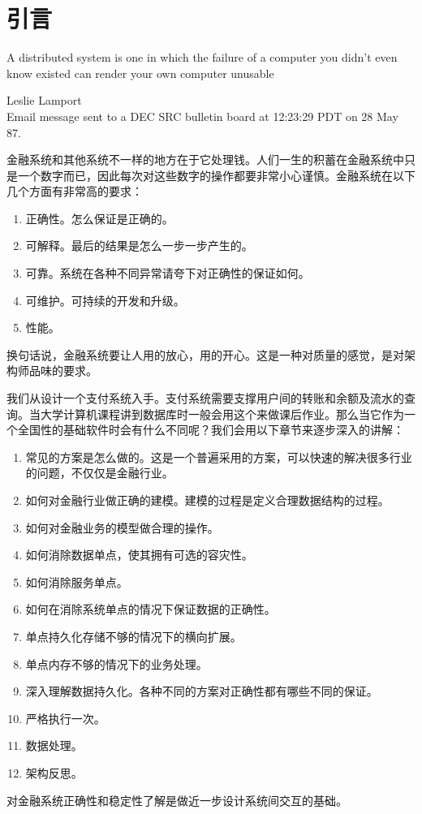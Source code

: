 \chapter{引言}


\epigraph{A distributed system is one in which the failure of a computer you didn't even know existed can render your own computer unusable}{Leslie Lamport \\ Email message sent to a DEC SRC bulletin board at 12:23:29 PDT on 28 May 87.}

金融系统和其他系统不一样的地方在于它处理钱。人们一生的积蓄在金融系统中只是一个数字而已，因此每次对这些数字的操作都要非常小心谨慎。金融系统在以下几个方面有非常高的要求：
\begin{enumerate}
    \item 正确性。怎么保证是正确的。
    \item 可解释。最后的结果是怎么一步一步产生的。
    \item 可靠。系统在各种不同异常请夸下对正确性的保证如何。
    \item 可维护。可持续的开发和升级。
    \item 性能。
\end{enumerate}

换句话说，金融系统要让人用的放心，用的开心。这是一种对质量的感觉，是对架构师品味的要求。

我们从设计一个支付系统入手。支付系统需要支撑用户间的转账和余额及流水的查询。当大学计算机课程讲到数据库时一般会用这个来做课后作业。那么当它作为一个全国性的基础软件时会有什么不同呢？我们会用以下章节来逐步深入的讲解：
\begin{enumerate}
    \item 常见的方案是怎么做的。这是一个普遍采用的方案，可以快速的解决很多行业的问题，不仅仅是金融行业。
    \item 如何对金融行业做正确的建模。建模的过程是定义合理数据结构的过程。
    \item 如何对金融业务的模型做合理的操作。
    \item 如何消除数据单点，使其拥有可选的容灾性。
    \item 如何消除服务单点。
    \item 如何在消除系统单点的情况下保证数据的正确性。
    \item 单点持久化存储不够的情况下的横向扩展。
    \item 单点内存不够的情况下的业务处理。
    \item 深入理解数据持久化。各种不同的方案对正确性都有哪些不同的保证。
    \item 严格执行一次。
    \item 数据处理。
    \item 架构反思。
\end{enumerate}


对金融系统正确性和稳定性了解是做近一步设计系统间交互的基础。


